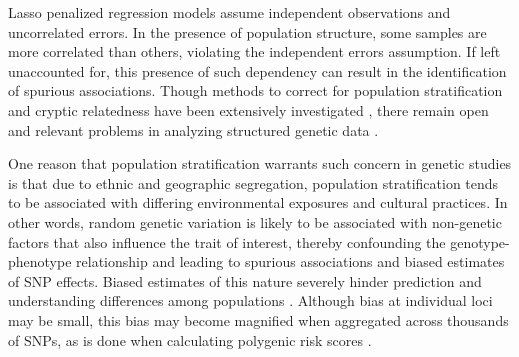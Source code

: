 Lasso penalized regression models assume independent observations and uncorrelated errors. In the presence of population structure, some samples are more correlated than others, violating the independent errors assumption. If left unaccounted for, this presence of such dependency can result in the identification of spurious associations. Though methods to correct for population stratification and cryptic relatedness have been extensively investigated \cite{Amin2007, hoffman2013correcting, price2006principal, Rakitsch2012, bhatnagar2019simultaneous, Sillanpaeae2011}, there remain open and relevant problems in analyzing structured genetic data \cite{lawson2019population, barton2019population}. 

One reason that population stratification warrants such concern in genetic studies is that due to ethnic and geographic segregation, population stratification tends to be associated with differing environmental exposures and cultural practices.  In other words, random genetic variation is likely to be associated with non-genetic factors that also influence the trait of interest, thereby confounding the genotype-phenotype relationship and leading to spurious associations and biased estimates of SNP effects. Biased estimates of this nature severely hinder prediction and understanding differences among populations \cite{barton2019population}. Although bias at individual loci may be small, this bias may become magnified when aggregated across thousands of SNPs, as is done when calculating polygenic risk scores \cite{barton2019population}.


